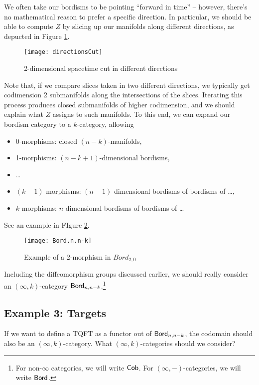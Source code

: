 We often take our bordisms to be pointing ``forward in time'' -- however, there's no mathematical reason to prefer a specific direction.
In particular, we should be able to compute $Z$ by slicing up our manifolds along different directions, as depucted in Figure \ref{fig:directionCuts}.
\begin{figure}[h]
\centering
\texttt{[image: directionsCut]}
\caption{2-dimensional spacetime cut in different directions}
\label{fig:directionCuts}
\end{figure}
Note that, if we compare slices taken in two different directions, we typically get codimension 2 submanifolds along the intersections of the slices.
Iterating this process produces closed submanifolds of higher codimension, and we should explain what $Z$ assigns to such manifolds.
To this end, we can expand our bordism category to a $k$-category, allowing
\begin{itemize}
	\item 0-morphisms: closed $(n-k)$-manifolds,
	\item 1-morphisms: $(n-k+1)$-dimensional bordisms,
	\item \dots
	\item $(k - 1)$-morphisms: $(n-1)$-dimensional bordisms of bordisms of \dots,
	\item $k$-morphisms: $n$-dimensional bordisms of bordisms of \dots
\end{itemize}
See an example in FIgure \ref{fig:Bord.n.n-k}.
\begin{figure}[h]
\centering
\texttt{[image: Bord.n.n-k]}
\caption{Example of a $2$-morphism in $Bord_{2,0}$}
\label{fig:Bord.n.n-k}
\end{figure}
Including the diffeomorphism groups discussed earlier, we should really consider an $(\infty, k)$-category $\mathsf{Bord}_{n,n-k}$.\footnote{For non-$\infty$ categories, we will write $\mathsf{Cob}$.
For $(\infty, -)$-categories, we will write $\mathsf{Bord}$.}

\subsection{Example 3: Targets}

If we want to define a TQFT as a functor out of $\mathsf{Bord}_{n,n-k}$, the codomain should also be an $(\infty, k)$-category.
What $(\infty, k)$-categories should we consider?

